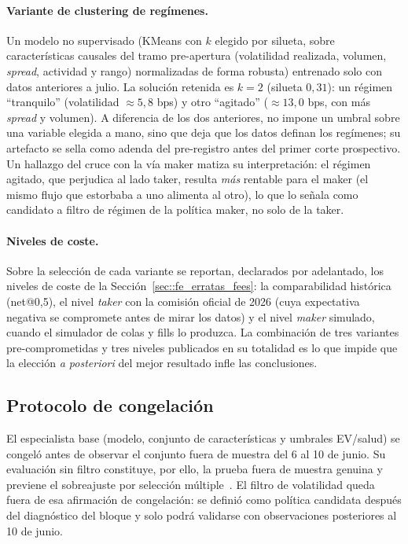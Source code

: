 \paragraph{Variante de clustering de regímenes.} Un modelo no supervisado (KMeans con
$k$ elegido por silueta, sobre características causales del tramo pre-apertura
(volatilidad realizada, volumen, \emph{spread}, actividad y rango) normalizadas de forma
robusta) entrenado solo con datos anteriores a julio. La solución retenida es $k=2$
(silueta $0{,}31$): un régimen ``tranquilo'' (volatilidad $\approx 5{,}8$ bps) y otro
``agitado'' ($\approx 13{,}0$ bps, con más \emph{spread} y volumen). A diferencia de los dos
anteriores, no impone un umbral sobre una variable elegida a mano, sino que deja que los
datos definan los regímenes; su artefacto se sella como adenda del pre-registro antes del
primer corte prospectivo. Un hallazgo del cruce con la vía maker matiza su interpretación:
el régimen agitado, que perjudica al lado taker, resulta \emph{más} rentable para el maker
(el mismo flujo que estorbaba a uno alimenta al otro), lo que lo señala como candidato a
filtro de régimen de la política maker, no solo de la taker.

\paragraph{Niveles de coste.} Sobre la selección de cada variante se reportan, declarados
por adelantado, los niveles de coste de la Sección~\ref{sec::fe_erratas_fees}: la
comparabilidad histórica (net@0,5), el nivel \emph{taker} con la comisión oficial de 2026
(cuya expectativa negativa se compromete antes de mirar los datos) y el nivel \emph{maker}
simulado, cuando el simulador de colas y fills lo produzca. La combinación de tres variantes
pre-comprometidas y tres niveles publicados en su totalidad es lo que impide que la elección \emph{a posteriori}
del mejor resultado infle las conclusiones.

\subsection{Protocolo de congelación}
\label{sec:congelacion}

El especialista base (modelo, conjunto de características y umbrales EV/salud) se congeló
antes de observar el conjunto fuera de muestra del 6 al 10 de junio. Su evaluación sin filtro
constituye, por ello, la prueba fuera de muestra genuina y previene el sobreajuste por
selección múltiple~\cite{bailey2014deflated}. El filtro de volatilidad queda fuera de esa
afirmación de congelación: se definió como política candidata después del diagnóstico del
bloque y solo podrá validarse con observaciones posteriores al 10 de junio.


